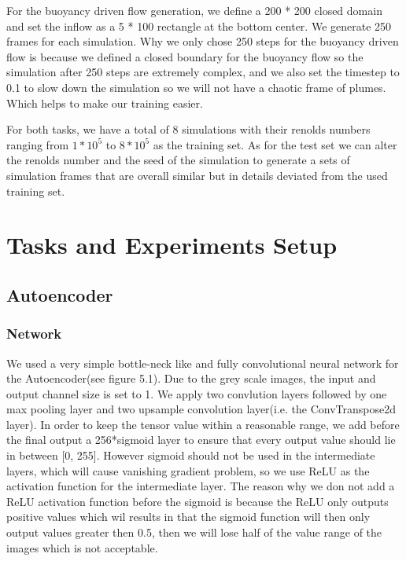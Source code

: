 \documentclass[a4paper,12pt,twoside]{report}
\begin{document}
For the buoyancy driven flow generation, we define a 200 * 200 closed domain and set the inflow as a 5 * 100 rectangle at the bottom center. We generate 250 frames for each simulation. Why we only chose 250 steps for the buoyancy driven flow is because we defined a closed boundary for the buoyancy flow so the simulation after 250 steps are extremely complex, and we also set the timestep to 0.1 to slow down the simulation so we will not have a chaotic frame of plumes. Which helps to make our training easier.

For both tasks, we have a total of 8 simulations with their renolds numbers ranging from $1*10^5$ to $8*10^5$ as the training set. As for the test set we can alter the renolds number and the seed of the simulation to generate a sets of simulation frames that are overall similar but in details deviated from the used training set. 








\chapter{Tasks and Experiments Setup}

\section{Autoencoder}
\subsection{Network}
We used a very simple bottle-neck like and fully convolutional neural network for the Autoencoder(see figure 5.1). Due to the grey scale images, the input and output channel size is set to 1. We apply two convlution layers followed by one max pooling layer and two upsample convolution layer(i.e. the ConvTranspose2d layer). In order to keep the tensor value within a reasonable range, we add before the final output a 256*sigmoid layer to ensure that every output value should lie in between [0, 255]. However sigmoid should not be used in the intermediate layers, which will cause vanishing gradient problem, so we use ReLU as the activation function for the intermediate layer. The reason why we don not add a ReLU activation function before the sigmoid is because the ReLU only outputs positive values which wil results in that the sigmoid function will then only output values greater then 0.5, then we will lose half of the value range of the images which is not acceptable.
\end{document}
